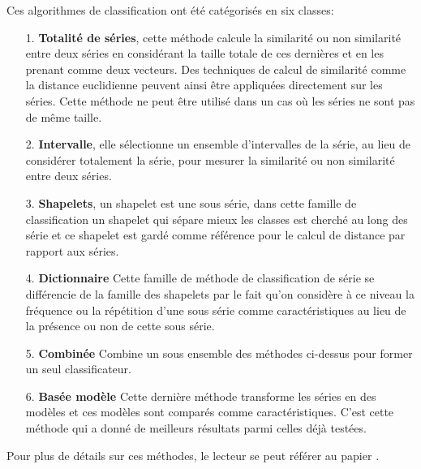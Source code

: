 \documentclass[french]{report}
\begin{document}
Ces algorithmes de classification ont été catégorisés en six classes:
\begin{itemize}
	\item[1. ] \textbf{Totalité de séries}, cette méthode calcule la similarité ou non similarité entre deux séries en considérant la taille totale de ces dernières et en les prenant comme deux vecteurs. Des techniques de calcul de similarité comme la distance euclidienne peuvent ainsi être appliquées directement sur les séries. Cette méthode ne peut être utilisé dans un cas où les séries ne sont pas de même taille.   
	\item [2. ] \textbf{Intervalle}, elle sélectionne un ensemble d'intervalles de la série, au lieu de considérer totalement la série, pour mesurer la similarité ou non similarité entre deux séries.
	\item [3. ] \textbf{Shapelets}, un shapelet est une sous série, dans cette famille de classification un shapelet qui sépare mieux les classes est cherché au long des série et ce shapelet est gardé comme référence pour le calcul de distance par rapport aux séries.
	\item [4. ] \textbf{Dictionnaire} Cette famille de méthode de classification de série se différencie de la famille des shapelets par le fait qu'on considère à ce niveau la fréquence ou la répétition d'une sous série comme caractéristiques au lieu de la présence ou non de cette sous série. 
	\item[5. ] \textbf{Combinée} Combine un sous ensemble des méthodes ci-dessus pour former un seul classificateur.
	\item[6. ] \textbf{Basée modèle} Cette dernière méthode transforme les séries en des modèles et ces modèles sont comparés comme caractéristiques. C'est cette méthode qui a donné de meilleurs résultats parmi celles déjà testées. 
\end{itemize}    
Pour plus de détails sur ces méthodes, le lecteur se peut référer au papier \cite{timereview}.\\ 
\end{document}
